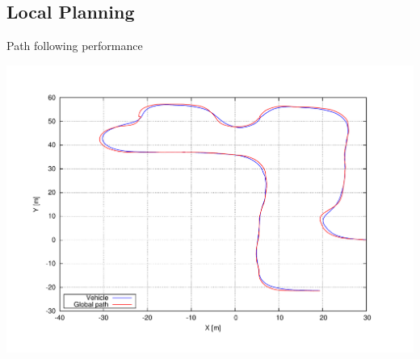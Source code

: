 \subsection{Local Planning}

\begin{frame}{Path following performance}
  \begin{center}
    \includegraphics[height=0.8\textheight,trim=50 40 80 60, clip]{differences}
  \end{center}
\end{frame}

